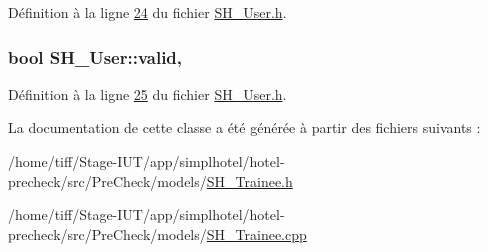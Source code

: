 Définition à la ligne \hyperlink{SH__User_8h_source_l00024}{24} du fichier \hyperlink{SH__User_8h_source}{S\-H\-\_\-\-User.\-h}.

\hypertarget{classSH__User_a91cae1175894bf2eef629405638db01c}{
\subsubsection[{valid}]{\setlength{\rightskip}{0pt plus 5cm}bool S\-H\-\_\-\-User\-::valid\hspace{0.3cm}{\ttfamily [read]}, {\ttfamily [inherited]}}}\label{classSH__User_a91cae1175894bf2eef629405638db01c}


Définition à la ligne \hyperlink{SH__User_8h_source_l00025}{25} du fichier \hyperlink{SH__User_8h_source}{S\-H\-\_\-\-User.\-h}.



La documentation de cette classe a été générée à partir des fichiers suivants \-:\begin{DoxyCompactItemize}
\item 
/home/tiff/\-Stage-\/\-I\-U\-T/app/simplhotel/hotel-\/precheck/src/\-Pre\-Check/models/\hyperlink{SH__Trainee_8h}{S\-H\-\_\-\-Trainee.\-h}\item 
/home/tiff/\-Stage-\/\-I\-U\-T/app/simplhotel/hotel-\/precheck/src/\-Pre\-Check/models/\hyperlink{SH__Trainee_8cpp}{S\-H\-\_\-\-Trainee.\-cpp}\end{DoxyCompactItemize}
